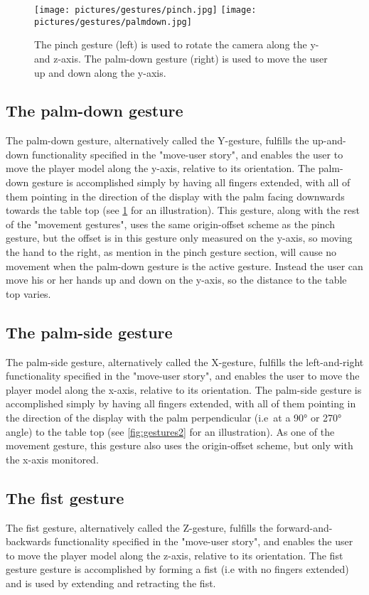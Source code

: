 \begin{figure}%
	\texttt{[image: pictures/gestures/pinch.jpg]}
    \texttt{[image: pictures/gestures/palmdown.jpg]}
	\caption[The pinch and palm-down gestures]{The pinch gesture (left) is used to rotate the camera along the y- and z-axis. 
             The palm-down gesture (right) is used to move the user up and down along the y-axis.}
	\label{fig:gestures1}
\end{figure} 

\subsection{The palm-down gesture}
The palm-down gesture, alternatively called the Y-gesture, fulfills the up-and-down functionality specified in the "move-user story", and enables the user to 
move the player model along the y-axis, relative to its orientation. The palm-down gesture is accomplished simply by having all fingers extended, with all of them pointing in
the direction of the display with the palm facing downwards towards the table top (see \ref{fig:gestures1} for an illustration). This gesture, along with the rest of the 
"movement gestures", uses the same origin-offset scheme as the pinch gesture, but the offset is in this gesture only measured on the y-axis, so moving the hand to the 
right, as mention in the pinch gesture section, will cause no movement when the palm-down gesture is the active gesture. 
Instead the user can move his or her hands up and down on the y-axis, so the distance to the table top varies.  

\subsection{The palm-side gesture}
The palm-side gesture, alternatively called the X-gesture, fulfills the left-and-right functionality specified in the "move-user story", and enables the user to 
move the player model along the x-axis, relative to its orientation. The palm-side gesture is accomplished simply by having all fingers extended, with all of them pointing in
the direction of the display with the palm perpendicular (i.e~at a 90° or 270° angle) to the table top (see \ref{fig:gestures2} for an illustration). 
As one of the movement gesture, this gesture also uses the origin-offset scheme, but only with the x-axis monitored.

\subsection{The fist gesture}
The fist gesture, alternatively called the Z-gesture, fulfills the forward-and-backwards functionality specified in the "move-user story", and enables the user to 
move the player model along the z-axis, relative to its orientation. The fist gesture gesture is accomplished by forming a fist (i.e with no fingers extended)
and is used by extending and retracting the fist. 

